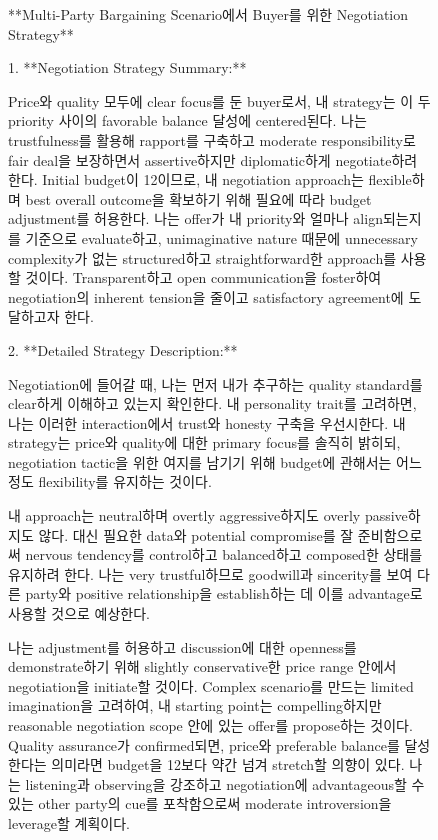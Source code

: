 \begin{figure}[htbp]
\centering
\begin{tcolorbox}[colback=blue!2!white, colframe=gray!50!blue]
\begin{minipage}{\linewidth}
\small
**Multi-Party Bargaining Scenario에서 Buyer를 위한 Negotiation Strategy**

1. **Negotiation Strategy Summary:**

Price와 quality 모두에 clear focus를 둔 buyer로서, 내 strategy는 이 두 priority 사이의 favorable balance 달성에 centered된다. 나는 trustfulness를 활용해 rapport를 구축하고 moderate responsibility로 fair deal을 보장하면서 assertive하지만 diplomatic하게 negotiate하려 한다. Initial budget이 12이므로, 내 negotiation approach는 flexible하며 best overall outcome을 확보하기 위해 필요에 따라 budget adjustment를 허용한다. 나는 offer가 내 priority와 얼마나 align되는지를 기준으로 evaluate하고, unimaginative nature 때문에 unnecessary complexity가 없는 structured하고 straightforward한 approach를 사용할 것이다. Transparent하고 open communication을 foster하여 negotiation의 inherent tension을 줄이고 satisfactory agreement에 도달하고자 한다.

2. **Detailed Strategy Description:**

Negotiation에 들어갈 때, 나는 먼저 내가 추구하는 quality standard를 clear하게 이해하고 있는지 확인한다. 내 personality trait를 고려하면, 나는 이러한 interaction에서 trust와 honesty 구축을 우선시한다. 내 strategy는 price와 quality에 대한 primary focus를 솔직히 밝히되, negotiation tactic을 위한 여지를 남기기 위해 budget에 관해서는 어느 정도 flexibility를 유지하는 것이다.

내 approach는 neutral하며 overtly aggressive하지도 overly passive하지도 않다. 대신 필요한 data와 potential compromise를 잘 준비함으로써 nervous tendency를 control하고 balanced하고 composed한 상태를 유지하려 한다. 나는 very trustful하므로 goodwill과 sincerity를 보여 다른 party와 positive relationship을 establish하는 데 이를 advantage로 사용할 것으로 예상한다.

나는 adjustment를 허용하고 discussion에 대한 openness를 demonstrate하기 위해 slightly conservative한 price range 안에서 negotiation을 initiate할 것이다. Complex scenario를 만드는 limited imagination을 고려하여, 내 starting point는 compelling하지만 reasonable negotiation scope 안에 있는 offer를 propose하는 것이다. Quality assurance가 confirmed되면, price와 preferable balance를 달성한다는 의미라면 budget을 12보다 약간 넘겨 stretch할 의향이 있다. 나는 listening과 observing을 강조하고 negotiation에 advantageous할 수 있는 other party의 cue를 포착함으로써 moderate introversion을 leverage할 계획이다.


\end{minipage}
\end{tcolorbox}
\end{figure}
